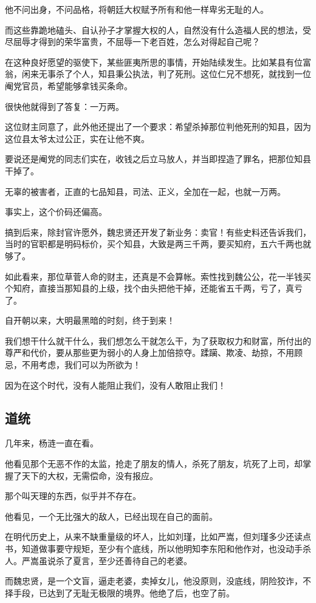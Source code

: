 \begin{multicols}{\theparacolNo}
他不问出身，不问品格，将朝廷大权赋予所有和他一样卑劣无耻的人。

而这些靠跪地磕头、自认孙子才掌握大权的人，自然没有什么造福人民的想法，受尽屈辱才得到的荣华富贵，不屈辱一下老百姓，怎么对得起自己呢？

在这种良好愿望的驱使下，某些匪夷所思的事情，开始陆续发生。比如某县有位富翁，闲来无事杀了个人，知县秉公执法，判了死刑。这位仁兄不想死，就找到一位阉党官员，希望能够拿钱买条命。

很快他就得到了答复：一万两。

这位财主同意了，此外他还提出了一个要求：希望杀掉那位判他死刑的知县，因为这位县太爷太过公正，实在让他不爽。

要说还是阉党的同志们实在，收钱之后立马放人，并当即捏造了罪名，把那位知县干掉了。

无辜的被害者，正直的七品知县，司法、正义，全加在一起，也就一万两。

事实上，这个价码还偏高。

搞到后来，除封官许愿外，魏忠贤还开发了新业务：卖官！有些史料还告诉我们，当时的官职都是明码标价，买个知县，大致是两三千两，要买知府，五六千两也就够了。

如此看来，那位草菅人命的财主，还真是不会算帐。索性找到魏公公，花一半钱买个知府，直接当那知县的上级，找个由头把他干掉，还能省五千两，亏了，真亏了。

自开朝以来，大明最黑暗的时刻，终于到来！

我们想干什么就干什么，我们想怎么干就怎么干，为了获取权力和财富，所付出的尊严和代价，要从那些更为弱小的人身上加倍掠夺。蹂躏、欺凌、劫掠，不用顾忌，不用考虑，我们可以为所欲为！

因为在这个时代，没有人能阻止我们，没有人敢阻止我们！

\subsection{道统}
几年来，杨涟一直在看。

他看见那个无恶不作的太监，抢走了朋友的情人，杀死了朋友，坑死了上司，却掌握了天下的大权，无需偿命，没有报应。

那个叫天理的东西，似乎并不存在。

他看见，一个无比强大的敌人，已经出现在自己的面前。

在明代历史上，从来不缺重量级的坏人，比如刘瑾，比如严嵩，但刘瑾多少还读点书，知道做事要守规矩，至少有个底线，所以他明知李东阳和他作对，也没动手杀人。严嵩虽说杀了夏言，至少还善待自己的老婆。

而魏忠贤，是一个文盲，逼走老婆，卖掉女儿，他没原则，没底线，阴险狡诈，不择手段，已达到了无耻无极限的境界。他绝了后，也空了前。


\end{multicols}
